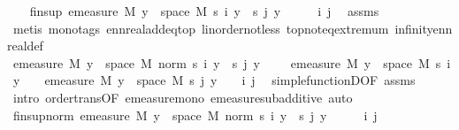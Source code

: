 \begin{isabellebody}
\ \ \isamarkupfalse%
\ fin{\isacharunderscore}{\kern0pt}sup{\isacharcolon}{\kern0pt}\ {\isachardoublequoteopen}emeasure\ M\ {\isacharbraceleft}{\kern0pt}y\ {\isasymin}\ space\ M{\isachardot}{\kern0pt}\ s\ i\ y\ {\isacharminus}{\kern0pt}\ s\ j\ y\ {\isasymnoteq}\ {}{\isacharbraceright}{\kern0pt}\ {\isasymnoteq}\ {\isasyminfinity}{\isachardoublequoteclose}\ \ i\ j\ \isamarkupfalse%
\ assms{\isacharparenleft}{\kern0pt}{}{\isacharparenright}{\kern0pt}\ \isamarkupfalse%
\ {\isacharparenleft}{\kern0pt}metis\ {\isacharparenleft}{\kern0pt}mono{\isacharunderscore}{\kern0pt}tags{\isacharparenright}{\kern0pt}\ ennreal{\isacharunderscore}{\kern0pt}add{\isacharunderscore}{\kern0pt}eq{\isacharunderscore}{\kern0pt}top\ linorder{\isacharunderscore}{\kern0pt}not{\isacharunderscore}{\kern0pt}less\ top{\isachardot}{\kern0pt}not{\isacharunderscore}{\kern0pt}eq{\isacharunderscore}{\kern0pt}extremum\ infinity{\isacharunderscore}{\kern0pt}ennreal{\isacharunderscore}{\kern0pt}def{\isacharparenright}{\kern0pt}\isanewline
\isanewline
\ \ \isamarkupfalse%
\ {\isachardoublequoteopen}emeasure\ M\ {\isacharbraceleft}{\kern0pt}y\ {\isasymin}\ space\ M{\isachardot}{\kern0pt}\ norm\ {\isacharparenleft}{\kern0pt}s\ i\ y\ {\isacharminus}{\kern0pt}\ s\ j\ y{\isacharparenright}{\kern0pt}\ {\isasymnoteq}\ {}{\isacharbraceright}{\kern0pt}\ {\isasymle}\ \ emeasure\ M\ {\isacharbraceleft}{\kern0pt}y\ {\isasymin}\ space\ M{\isachardot}{\kern0pt}\ s\ i\ y\ {\isasymnoteq}\ {}{\isacharbraceright}{\kern0pt}\ {\isacharplus}{\kern0pt}\ emeasure\ M\ {\isacharbraceleft}{\kern0pt}y\ {\isasymin}\ space\ M{\isachardot}{\kern0pt}\ s\ j\ y\ {\isasymnoteq}\ {}{\isacharbraceright}{\kern0pt}{\isachardoublequoteclose}\ \ i\ j\ \isamarkupfalse%
\ simple{\isacharunderscore}{\kern0pt}functionD{\isacharparenleft}{\kern0pt}{}{\isacharparenright}{\kern0pt}{\isacharbrackleft}{\kern0pt}OF\ assms{\isacharparenleft}{\kern0pt}{}{\isacharparenright}{\kern0pt}{\isacharbrackright}{\kern0pt}\ \isamarkupfalse%
\ {\isacharparenleft}{\kern0pt}intro\ order{\isacharunderscore}{\kern0pt}trans{\isacharbrackleft}{\kern0pt}OF\ emeasure{\isacharunderscore}{\kern0pt}mono\ emeasure{\isacharunderscore}{\kern0pt}subadditive{\isacharbrackright}{\kern0pt}{\isacharcomma}{\kern0pt}\ auto{\isacharparenright}{\kern0pt}\isanewline
\ \ \isamarkupfalse%
\ fin{\isacharunderscore}{\kern0pt}sup{\isacharunderscore}{\kern0pt}norm{\isacharcolon}{\kern0pt}\ {\isachardoublequoteopen}emeasure\ M\ {\isacharbraceleft}{\kern0pt}y\ {\isasymin}\ space\ M{\isachardot}{\kern0pt}\ norm\ {\isacharparenleft}{\kern0pt}s\ i\ y\ {\isacharminus}{\kern0pt}\ s\ j\ y{\isacharparenright}{\kern0pt}\ {\isasymnoteq}\ {}{\isacharbraceright}{\kern0pt}\ {\isasymnoteq}\ {\isasyminfinity}{\isachardoublequoteclose}\ \ i\ j\ \isamarkupfalse%

\end{isabellebody}
